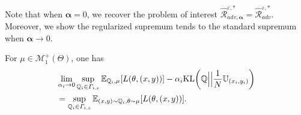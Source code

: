 Note that when $\bm{\alpha}=0$, we recover the problem of interest $\widehat{\mathcal{R}}_{adv,\bm{\alpha}}^{\varepsilon,*}=\widehat{\mathcal{R}}_{adv}^{\varepsilon,*}$. Moreover, we show the regularized supremum tends to the standard supremum when $\bm{\alpha}\to 0$.
\begin{prop}
\label{prop:limit-eps}
For $\mu\in\mathcal{M}_{1}^{+}(\Theta)$, one has
\begin{align*}
    &\lim_{\alpha_i\rightarrow 0}\sup_{\QQ_i\in\Gamma_{i,\varepsilon}}\mathbb{E}_{\QQ_i,\mu}\left[\loss(\theta,(x,y))\right]-\alpha_i\text{KL}\left(\QQ\Big|\Big|\frac{1}{\numsamples}\mathbb{U}_{(x_i,y_i)}\right)\\
    &=\sup_{\QQ_i\in\Gamma_{i,\varepsilon}}\mathbb{E}_{(x,y)\sim \QQ_i,\theta \sim \mu}\left[\loss(\theta,(x,y))\right].
\end{align*}
\end{prop}
